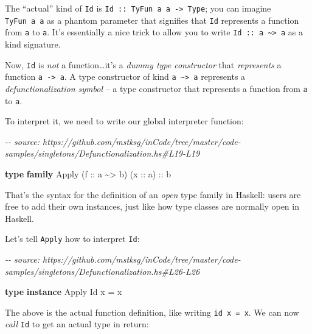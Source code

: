 \documentclass[]{article}
\newenvironment{Shaded}{}{}
\newcommand{\CommentTok}[1]{\textcolor[rgb]{0.38,0.63,0.69}{\textit{#1}}}
\newcommand{\DataTypeTok}[1]{\textcolor[rgb]{0.56,0.13,0.00}{#1}}
\newcommand{\KeywordTok}[1]{\textcolor[rgb]{0.00,0.44,0.13}{\textbf{#1}}}
\newcommand{\NormalTok}[1]{#1}
\newcommand{\OperatorTok}[1]{\textcolor[rgb]{0.40,0.40,0.40}{#1}}
\newcommand{\OtherTok}[1]{\textcolor[rgb]{0.00,0.44,0.13}{#1}}
\begin{document}
The ``actual'' kind of \texttt{Id} is
\texttt{Id\ ::\ TyFun\ a\ a\ -\textgreater{}\ Type}; you can imagine
\texttt{TyFun\ a\ a} as a phantom parameter that signifies that \texttt{Id}
represents a function from \texttt{a} to \texttt{a}. It's essentially a nice
trick to allow you to write
\texttt{Id\ ::\ a\ \textasciitilde{}\textgreater{}\ a} as a kind signature.

Now, \texttt{Id} is \emph{not} a function\ldots it's a \emph{dummy type
constructor} that \emph{represents} a function \texttt{a\ -\textgreater{}\ a}. A
type constructor of kind \texttt{a\ \textasciitilde{}\textgreater{}\ a}
represents a \emph{defunctionalization symbol} -- a type constructor that
represents a function from \texttt{a} to \texttt{a}.

To interpret it, we need to write our global interpreter function:

\begin{Shaded}
\begin{Highlighting}[]
\CommentTok{{-}{-} source: https://github.com/mstksg/inCode/tree/master/code{-}samples/singletons/Defunctionalization.hs\#L19{-}L19}

\KeywordTok{type} \KeywordTok{family} \DataTypeTok{Apply}\NormalTok{ (}\OtherTok{f ::}\NormalTok{ a }\OperatorTok{\textasciitilde{}>}\NormalTok{ b) (}\OtherTok{x ::}\NormalTok{ a)}\OtherTok{ ::}\NormalTok{ b}
\end{Highlighting}
\end{Shaded}

That's the syntax for the definition of an \emph{open} type family in Haskell:
users are free to add their own instances, just like how type classes are
normally open in Haskell.

Let's tell \texttt{Apply} how to interpret \texttt{Id}:

\begin{Shaded}
\begin{Highlighting}[]
\CommentTok{{-}{-} source: https://github.com/mstksg/inCode/tree/master/code{-}samples/singletons/Defunctionalization.hs\#L26{-}L26}

\KeywordTok{type} \KeywordTok{instance} \DataTypeTok{Apply} \DataTypeTok{Id}\NormalTok{ x }\OtherTok{=}\NormalTok{ x}
\end{Highlighting}
\end{Shaded}

The above is the actual function definition, like writing \texttt{id\ x\ =\ x}.
We can now \emph{call} \texttt{Id} to get an actual type in return:
\end{document}

